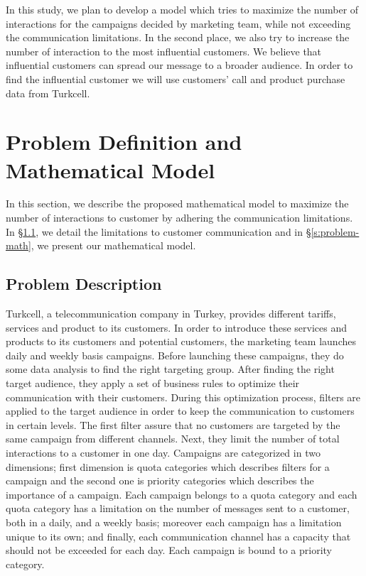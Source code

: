 \documentclass[11pt]{article}
\begin{document}
In this study, we plan to develop a model which tries to maximize the number of interactions for the campaigns decided by marketing team, while not exceeding the communication limitations. In the second place, we also try to increase the number of interaction to the most influential customers. We believe that influential customers can spread our message to a broader audience. In order to find the influential customer we will use customers' call and product purchase data from Turkcell.

\section{Problem Definition and Mathematical Model}  \label{s:problem-model}

In this section, we describe the proposed mathematical model to maximize the number of interactions to customer by adhering the communication limitations. In \S \ref{s:problem-desc}, we detail the limitations to customer communication and in \S \ref{s:problem-math}, we present our mathematical model.

\subsection{Problem Description} \label{s:problem-desc}

Turkcell, a telecommunication company in Turkey, provides different tariffs, services and product to its customers. In order to introduce these services and products to its customers and potential customers, the marketing team launches daily and weekly basis campaigns. Before launching these campaigns, they do some data analysis to find the right targeting group. After finding the right target audience, they apply a set of business rules to optimize their communication with their customers. During this optimization process, filters are applied to the target audience in order to keep the communication to customers in certain levels. The first filter assure that no customers are targeted by the same campaign from different channels. Next, they limit the number of total interactions to a customer in one day. Campaigns are categorized in two dimensions; first dimension is quota categories which describes filters for a campaign and the second one is priority categories which describes the importance of a campaign. Each campaign belongs to a quota category and each quota category has a limitation on the number of messages sent to a customer, both in a daily, and a weekly basis; moreover each campaign has a limitation unique to its own; and finally, each communication channel has a capacity that should not be exceeded for each day. Each campaign is bound to a priority category.\\
\end{document}
